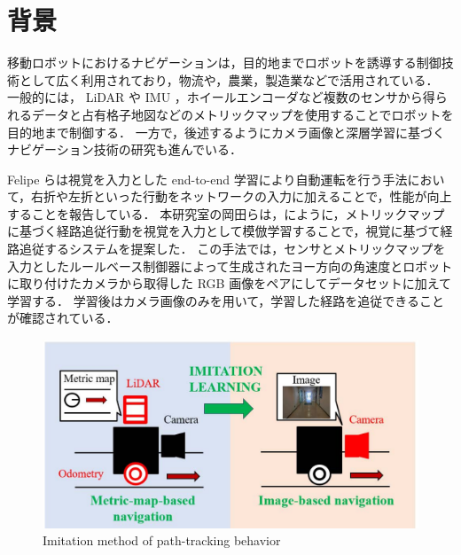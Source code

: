 
\section{背景}
移動ロボットにおけるナビゲーションは，目的地までロボットを誘導する制御技術として広く利用されており，物流や，農業，製造業などで活用されている．
一般的には， LiDAR や IMU ，ホイールエンコーダなど複数のセンサから得られるデータと占有格子地図などのメトリックマップを使用することでロボットを目的地まで制御する．
一方で，後述するようにカメラ画像と深層学習に基づくナビゲーション技術の研究も進んでいる．

Felipe ら\cite{codevilla2018endtoend}は視覚を入力とした end-to-end 学習により自動運転を行う手法において，右折や左折といった行動をネットワークの入力に加えることで，性能が向上することを報告している．
本研究室の岡田ら\cite{okada2020}\cite{okada2021}は，にように，メトリックマップに基づく経路追従行動を視覚を入力として模倣学習することで，視覚に基づて経路追従するシステムを提案した．
この手法では，センサとメトリックマップを入力としたルールベース制御器によって生成されたヨー方向の角速度とロボットに取り付けたカメラから取得した RGB 画像をペアにしてデータセットに加えて学習する．
学習後はカメラ画像のみを用いて，学習した経路を追従できることが確認されている．
\begin{figure}[h]
     \centering
     \includegraphics[width=120mm]{images/pdf/ishiguro/system.pdf}
     \caption{Imitation method of path-tracking behavior}
     \label{fig:imitation_sys}
\end{figure}

